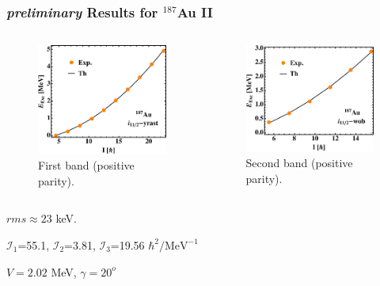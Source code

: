 \documentclass{beamer}
\begin{document}
\begin{frame}
    \frametitle{{\tiny \emph{preliminary}} Results for $^{187}$Au II}
    \begin{columns}[c] 
     \begin{figure}
         \centering
         \includegraphics[scale=0.4]{figs/Au_187_1.pdf}
         \caption{First band (positive parity).}
     \end{figure}
     \begin{figure}
         \centering
         \includegraphics[scale=0.4]{figs/Au_187_2.pdf}
         \caption{Second band (positive parity).}
     \end{figure}
    \end{columns}
    \par $rms\approx23$ keV.
    \par $\mathcal{I}_1$=55.1, $\mathcal{I}_2$=3.81, $\mathcal{I}_3$=19.56 $\hbar^2/\text{MeV}^{-1}$
    \par $V=2.02$ MeV, $\gamma=20^o$
\end{frame}
\end{document}
